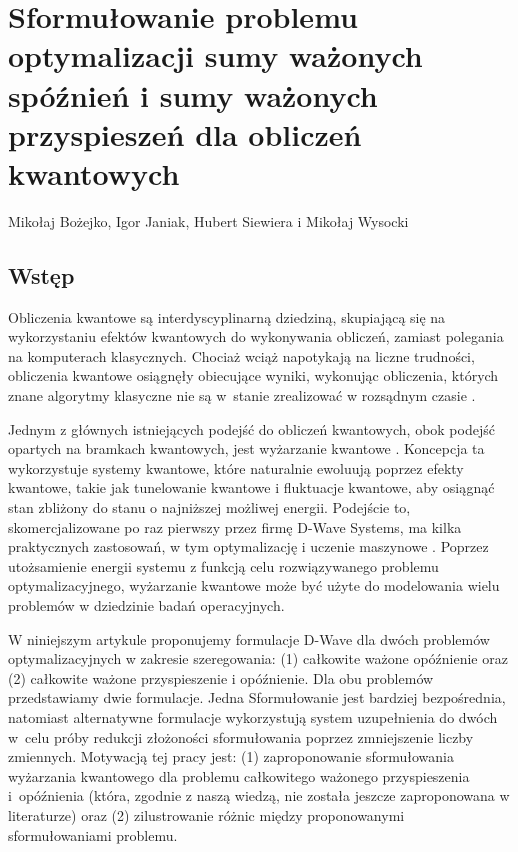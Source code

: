 {}
\chapter[Sformułowanie problemu \ldots]{Sformułowanie problemu optymalizacji sumy ważonych spóźnień i sumy ważonych przyspieszeń dla obliczeń kwantowych}
\thispagestyle{empty}
\vspace{-8mm} {\large Mikołaj Bożejko, Igor Janiak, Hubert Siewiera i Mikołaj Wysocki} \vspace{8mm}

\newcommand{\Np}{\mathbb{N}_+}
\newcommand{\wiTi}{1||\Sigma{}w_i T_i}
\newcommand{\uiEi}{1||(\Sigma{}w_i T_i+u_i E_i)}



\section{Wstęp}

Obliczenia kwantowe są interdyscyplinarną dziedziną, skupiającą się na wykorzystaniu efektów kwantowych do wykonywania obliczeń, zamiast polegania na komputerach klasycznych. Chociaż wciąż napotykają na liczne trudności, obliczenia kwantowe osiągnęły obiecujące wyniki, wykonując obliczenia, których znane algorytmy klasyczne nie są w~stanie zrealizować w rozsądnym czasie \cite{doi:10.1126/science.ado6285}.

Jednym z głównych istniejących podejść do obliczeń kwantowych, obok podejść opartych na bramkach kwantowych, jest wyżarzanie kwantowe \cite{PhysRevE.58.5355}. Koncepcja ta wykorzystuje systemy kwantowe, które naturalnie ewoluują poprzez efekty kwantowe, takie jak tunelowanie kwantowe i fluktuacje kwantowe, aby osiągnąć stan zbliżony do stanu o najniższej możliwej energii. Podejście to, skomercjalizowane po raz pierwszy przez firmę D-Wave Systems, ma kilka praktycznych zastosowań, w tym optymalizację i uczenie maszynowe \cite{https://doi.org/10.1002/que2.12}. Poprzez utożsamienie energii systemu z funkcją celu rozwiązywanego problemu optymalizacyjnego, wyżarzanie kwantowe może być użyte do modelowania wielu problemów w dziedzinie badań operacyjnych.

W niniejszym artykule proponujemy formulacje D-Wave dla dwóch problemów optymalizacyjnych w zakresie szeregowania: (1) całkowite ważone opóźnienie oraz (2) całkowite ważone przyspieszenie i opóźnienie. Dla obu problemów przedstawiamy dwie formulacje. Jedna Sformułowanie jest bardziej bezpośrednia, natomiast alternatywne formulacje wykorzystują system uzupełnienia do dwóch w~celu próby redukcji złożoności sformułowania poprzez zmniejszenie liczby zmiennych. Motywacją tej pracy jest: (1) zaproponowanie sformułowania wyżarzania kwantowego dla problemu całkowitego ważonego przyspieszenia i~opóźnienia (która, zgodnie z naszą wiedzą, nie została jeszcze zaproponowana w literaturze) oraz (2) zilustrowanie różnic między proponowanymi sformułowaniami problemu.

